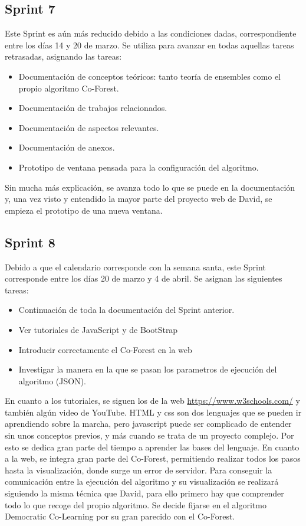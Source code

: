 \subsection{Sprint 7}
Este Sprint es aún más reducido debido a las condiciones dadas, correspondiente entre los días 14 y 20 de marzo. Se utiliza para avanzar en todas aquellas tareas retrasadas, asignando las tareas:
\begin{itemize}
	\item Documentación de conceptos teóricos: tanto teoría de ensembles como el propio algoritmo Co-Forest.
	\item Documentación de trabajos relacionados.
	\item Documentación de aspectos relevantes.
	\item Documentación de anexos.
	\item Prototipo de ventana pensada para la configuración del algoritmo.
	
\end{itemize}
Sin mucha más explicación, se avanza todo lo que se puede en la documentación y, una vez visto y entendido la mayor parte del proyecto web de David, se empieza el prototipo de una nueva ventana.

\subsection{Sprint 8}
Debido a que el calendario corresponde con la semana santa, este Sprint corresponde entre los días 20 de marzo y 4 de abril. Se asignan las siguientes tareas:
 \begin{itemize}
 	\item Continuación de toda la documentación del Sprint anterior.
 	\item Ver tutoriales de JavaScript y de BootStrap
 	\item Introducir correctamente el Co-Forest en la web
 	\item Investigar la manera en la que se pasan los parametros de ejecución del algoritmo (JSON).
 	
 \end{itemize}
En cuanto a los tutoriales, se siguen los de la web \url{https://www.w3schools.com/} y también algún video de YouTube. HTML y css son dos lenguajes que se pueden ir aprendiendo sobre la marcha, pero javascript puede ser complicado de entender sin unos conceptos previos, y más cuando se trata de un proyecto complejo. Por esto se dedica gran parte del tiempo a aprender las bases del lenguaje. 
En cuanto a la web, se integra gran parte del Co-Forest, permitiendo realizar todos los pasos hasta la visualización, donde surge un error de servidor.
Para conseguir la comunicación entre la ejecución del algoritmo y su visualización se realizará siguiendo la misma técnica que David, para ello primero hay que comprender todo lo que recoge del propio algoritmo. Se decide fijarse en el algoritmo Democratic Co-Learning por su gran parecido con el Co-Forest.

